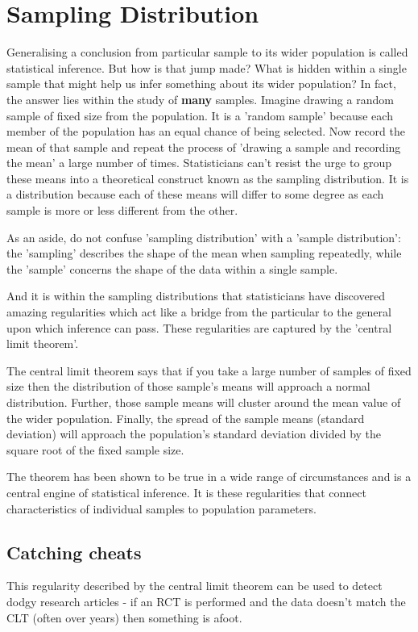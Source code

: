 \documentclass[a4paper,twosided,notoc]{tufte-book}
\begin{document}
\section{Sampling Distribution}
Generalising a conclusion from particular sample to its wider population is called statistical inference. But how is that jump made? What is hidden within a single sample that might help us infer something about its wider population? In fact, the answer lies within the study of \textbf{many} samples. Imagine drawing a random sample of fixed size from the population. It is a 'random sample' because each member of the population has an equal chance of being selected. Now record the mean  of that sample and repeat the process of 'drawing a sample and recording the mean' a large number of times. Statisticians can't resist the urge to group these means into a theoretical construct known as the sampling distribution. It is a distribution because each of these means will differ to some degree as each sample is more or less different from the other.

As an aside, do not confuse 'sampling distribution' with a 'sample distribution': the 'sampling' describes the shape of the mean when sampling repeatedly, while the 'sample' concerns the shape of the data within a single sample.

And it is within the sampling distributions that statisticians have discovered amazing regularities which act like a bridge from the particular to the general upon which inference can pass. These regularities are captured by the 'central limit theorem'.

The central limit theorem says that if you take a large number of samples of fixed size then the distribution of those sample's means will approach a normal distribution. Further, those sample means will cluster around the mean value of the wider population. Finally, the spread of the sample means (standard deviation) will approach the population's standard deviation divided by the square root of the fixed sample size.

The theorem has been shown to be true in a wide range of circumstances and is a central engine of statistical inference. It is these regularities that connect characteristics of individual samples to population parameters.

\subsection{Catching cheats}
This regularity described by the central limit theorem can be used to detect dodgy research articles - if an RCT is performed and the data doesn't match the CLT (often over years) then something is afoot.
\end{document}
